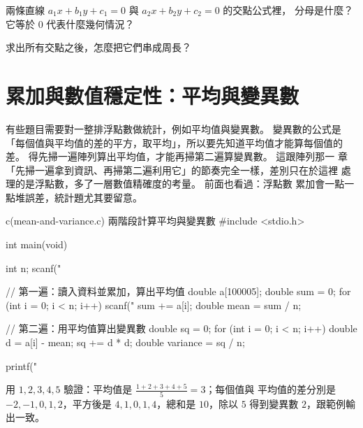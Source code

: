 
\begin{drills}[label=drills:float-line-intersect]
\item 兩條直線 $a_1x+b_1y+c_1=0$ 與 $a_2x+b_2y+c_2=0$ 的交點公式裡，
分母是什麼？ 它等於 $0$ 代表什麼幾何情況？
\item 求出所有交點之後，怎麼把它們串成周長？
\end{drills}

\section{累加與數值穩定性：平均與變異數}
\label{sec:float-mean-variance}

有些題目需要對一整排浮點數做統計，例如平均值與變異數。 變異數的公式是
「每個值與平均值的差的平方，取平均」，所以要先知道平均值才能算每個值的
差。 得先掃一遍陣列算出平均值，才能再掃第二遍算變異數。 這跟陣列那一
章「先掃一遍拿到資訊、再掃第二遍利用它」的節奏完全一樣，差別只在於這裡
處理的是浮點數，多了一層數值精確度的考量。 前面也看過：浮點數
累加會一點一點堆誤差，統計題尤其要留意。

\begin{example}{c}{(mean-and-variance.c) 兩階段計算平均與變異數}
#include <stdio.h>

int main(void) {
    int n;
    scanf("%

    // 第一遍：讀入資料並累加，算出平均值
    double a[100005];
    double sum = 0;
    for (int i = 0; i < n; i++) {
        scanf("%
        sum += a[i];
    }
    double mean = sum / n;

    // 第二遍：用平均值算出變異數
    double sq = 0;
    for (int i = 0; i < n; i++) {
        double d = a[i] - mean;
        sq += d * d;
    }
    double variance = sq / n;

    printf("%
}
\end{example}


用 $1, 2, 3, 4, 5$ 驗證：平均值是 $\frac{1+2+3+4+5}{5} = 3$；每個值與
平均值的差分別是 $-2, -1, 0, 1, 2$，平方後是
$4, 1, 0, 1, 4$，總和是 $10$，除以 $5$ 得到變異數 $2$，跟範例輸出一致。

